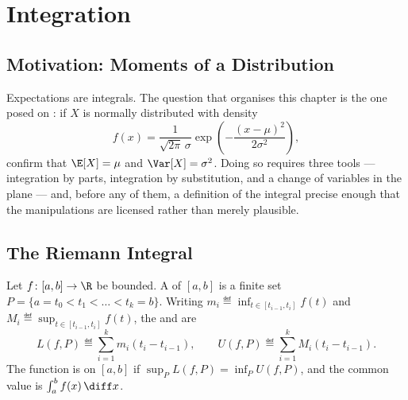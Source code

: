 
\chapter{Integration}
\label{ch:integration}

\section{Motivation: Moments of a Distribution}\label{sec:int-motivation}

Expectations are integrals. The question that organises this chapter is the one
posed on \autocite[slide 65]{fukuda2026calculus}: if $X$ is normally distributed
with density
\begin{equation}\label{eq:normal-density}
	f(x)=\frac{1}{\sqrt{2\pi}\,\sigma}\exp\left(-\frac{(x-\mu)^2}{2\sigma^2}\right),
\end{equation}
confirm that $\E[X]=\mu$ and $\Var[X]=\sigma^2$. Doing so requires three tools
--- integration by parts, integration by substitution, and a change of variables
in the plane --- and, before any of them, a definition of the integral precise
enough that the manipulations are licensed rather than merely plausible.

\section{The Riemann Integral}\label{sec:int-riemann}

\begin{definition}\label{def:darboux}
	Let $f\colon[a,b]\to\R$ be bounded. A  of $[a,b]$ is a finite set
	$P=\{a=t_0<t_1<\dots<t_k=b\}$. Writing
	$m_i\eqdef\inf_{t\in[t_{i-1},t_i]}f(t)$ and
	$M_i\eqdef\sup_{t\in[t_{i-1},t_i]}f(t)$, the  and  are
	\[
		L(f,P)\eqdef\sum_{i=1}^{k}m_i(t_i-t_{i-1}),
		\qquad
		U(f,P)\eqdef\sum_{i=1}^{k}M_i(t_i-t_{i-1}).
	\]
	The function is  on $[a,b]$ if
	$\sup_PL(f,P)=\inf_PU(f,P)$, and the common value is $\int_a^bf(x)\,\diff x$.
\end{definition}

